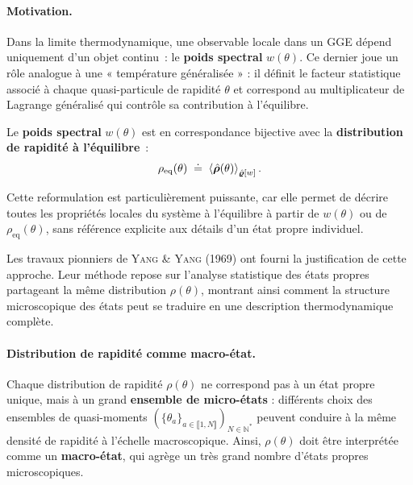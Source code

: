 \paragraph{Motivation.}

Dans la limite thermodynamique, une observable locale dans un \gls{GGE} dépend uniquement d’un objet continu : le \textbf{poids spectral} $w(\theta)$. 
Ce dernier joue un rôle analogue à une « température généralisée » : il définit le facteur statistique associé à chaque quasi-particule de rapidité $\theta$ et correspond au multiplicateur de Lagrange généralisé qui contrôle sa contribution à l’équilibre.

\medskip

Le \textbf{poids spectral} $w(\theta)$ est en correspondance bijective avec la \textbf{distribution de rapidité à l’équilibre} :
\begin{eqnarray}\label{chap.2:eq.rho.eq.1}
	\rho_{\mathrm{eq}}(\theta)\;\doteq\;\braket{\hat{\bm{\rho}}(\theta)}_{\hat{\bm{\varrho}}[w]}	.  
\end{eqnarray}

\medskip

Cette reformulation est particulièrement puissante, car elle permet de décrire toutes les propriétés locales du système à l’équilibre à partir de $w(\theta)$ ou de $\rho_{\mathrm{eq}}(\theta)$, sans référence explicite aux détails d’un état propre individuel.


\medskip

Les travaux pionniers de \textsc{Yang \& Yang} (1969) \cite{YangYang_1969} ont fourni la justification de cette approche. Leur méthode repose sur l’analyse statistique des états propres partageant la même distribution $\rho(\theta)$, montrant ainsi comment la structure microscopique des états peut se traduire en une description thermodynamique complète.


\paragraph{Distribution de rapidité comme macro-état.}

Chaque distribution de rapidité $\rho(\theta)$ ne correspond pas à un état propre unique, mais à un grand {\bf ensemble de micro-états} : différents choix des ensembles de quasi-moments $(\{\theta_a\}_{a \in \llbracket 1 , N \rrbracket })_{N \in \mathbb{N}^\ast} $ peuvent conduire à la même densité de rapidité à l’échelle macroscopique. Ainsi, $\rho(\theta)$ doit être interprétée comme un {\bf macro-état}, qui agrège un très grand nombre d’états propres microscopiques.

